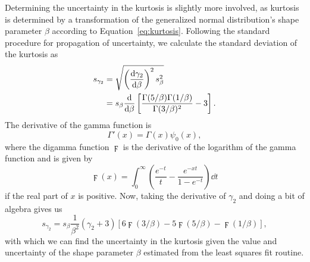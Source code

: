 Determining the uncertainty in the kurtosis is slightly more involved, as kurtosis is determined by a transformation of the generalized normal distribution's shape parameter $\beta$ according to Equation~\ref{eq:kurtosis}.  Following the standard procedure for propagation of uncertainty, we calculate the standard deviation of the kurtosis as
\begin{align} \label{eq:kurt_err_partial}
    s_{\gamma_{2}} &= \sqrt{ \left( \frac{{\rm {d}} \gamma_{2}}{{\rm {d}} \beta} \right)^{2} s_{\beta}^{2} } \\
        &= s_{\beta} \frac{{\rm {d}}}{{\rm {d}} \beta} \left[ \frac{\Gamma(5/\beta) \Gamma(1/\beta)}{\Gamma(3/\beta)^{2}} - 3 \right].
\end{align}
The derivative of the gamma function is
\begin{equation} \label{eq:gamma_prime}
    \Gamma'(x) = \Gamma(x) \psi_{0}(x),
\end{equation}
where the digamma function $\digamma$ is the derivative of the logarithm of the gamma function and is given by
\begin{equation} \label{eq:digamma}
    \digamma(x) = \int_{0}^{\infty} \left( \frac{e^{-t}}{t} - \frac{e^{-xt}}{1 - e^{-t}} \right) \dd t
\end{equation}
if the real part of $x$ is positive.  Now, taking the derivative of $\gamma_{2}$ and doing a bit of algebra gives us
\begin{equation} \label{eq:kurt_err}
    s_{\gamma_{2}} = s_{\beta} \frac{1}{\beta^{2}} \left( \gamma_{2} + 3 \right) \left[ 6 \digamma(3/\beta) - 5 \digamma(5/\beta) - \digamma(1/\beta) \right],
\end{equation}
with which we can find the uncertainty in the kurtosis given the value and uncertainty of the shape parameter $\beta$ estimated from the least squares fit routine.

